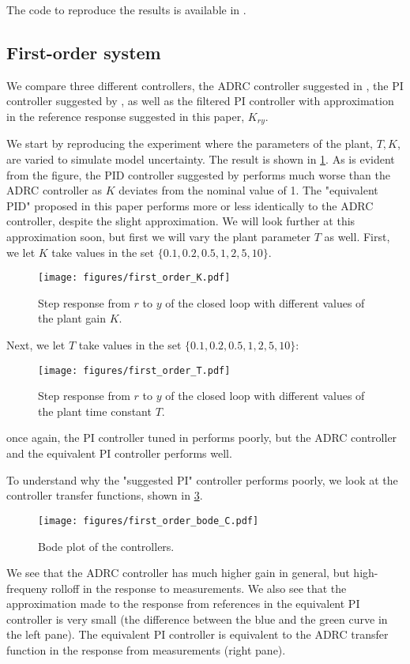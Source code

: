 \documentclass[letterpaper, 10 pt, conference]{ieeeconf}
\begin{document}
The code to reproduce the results is available in \cite{repo}.

\subsection{First-order system}

We compare three different controllers, the ADRC controller suggested in \cite{herbst2013simulative}, the PI controller suggested by \cite{herbst2013simulative}, as well as the filtered PI controller with approximation in the reference response suggested in this paper, $K_{ry}$.

We start by reproducing the experiment where the parameters of the plant, $T,K$, are varied to simulate model uncertainty. The result is shown in \cref{fig:first_order_K}. As is evident from the figure, the PID controller suggested by \cite{herbst2013simulative} performs much worse than the ADRC controller as $K$ deviates from the nominal value of 1. The "equivalent PID" proposed in this paper performs more or less identically to the ADRC controller, despite the slight approximation. We will look further at this approximation soon, but first we will vary the plant parameter $T$ as well.
First, we let $K$ take values in the set $\{0.1, 0.2, 0.5, 1, 2, 5, 10\}$.
\begin{figure}[h]
	\centering
	\texttt{[image: figures/first\_order\_K.pdf]}
	\caption{Step response from $r$ to $y$  of the closed loop with different values of the plant gain $K$.}
	\label{fig:first_order_K}
\end{figure}

Next, we let $T$ take values in the set $\{0.1, 0.2, 0.5, 1, 2, 5, 10\}$:
\begin{figure}[h]
	\centering
	\texttt{[image: figures/first\_order\_T.pdf]}
	\caption{Step response from $r$ to $y$  of the closed loop with different values of the plant time constant $T$.}
	\label{fig:first_order_T}
\end{figure}
once again, the PI controller tuned in \cite{herbst2013simulative} performs poorly, but the ADRC controller and the equivalent PI controller performs well.

To understand why the "suggested PI" controller performs poorly, we look at the controller transfer functions, shown in \cref{fig:first_order_bode_C}.
\begin{figure}[h]
	\centering
	\texttt{[image: figures/first\_order\_bode\_C.pdf]}
	\caption{Bode plot of the controllers.}
	\label{fig:first_order_bode_C}
\end{figure}
We see that the ADRC controller has much higher gain in general, but high-frequeny rolloff in the response to measurements. We also see that the approximation made to the response from references in the equivalent PI controller is very small (the difference between the blue and the green curve in the left pane). The equivalent PI controller is equivalent to the ADRC transfer function in the response from measurements (right pane).
\end{document}

